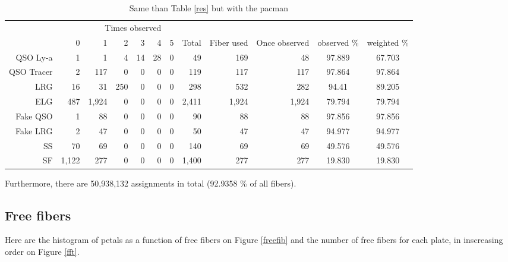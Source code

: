 \documentclass{extarticle}
\begin{document}
\begin{table}[H]\begin{center}
\begin{tabular}{rrrrrrrrrrcc}
\hline
\multicolumn{6}{r}{Times observed} \\
	~ &           0 &     1 &  2 & 3 & 4 & 5 &  Total & Fiber used & Once observed & observed $\%$ & weighted $\%$ \\ \hline
   QSO Ly-a   &     1 &     1 &   4 & 14 & 28 & 0 &    49 &   169 &    48 & 97.889 & 67.703\\ 
 QSO Tracer   &     2 &   117 &   0 &  0 &  0 & 0 &   119 &   117 &   117 & 97.864 & 97.864\\ 
        LRG   &    16 &    31 & 250 &  0 &  0 & 0 &   298 &   532 &   282 &  94.41 & 89.205\\ 
        ELG   &   487 & 1,924 &   0 &  0 &  0 & 0 & 2,411 & 1,924 & 1,924 & 79.794 & 79.794\\ 
   Fake QSO   &     1 &    88 &   0 &  0 &  0 & 0 &    90 &    88 &    88 & 97.856 & 97.856\\ 
   Fake LRG   &     2 &    47 &   0 &  0 &  0 & 0 &    50 &    47 &    47 & 94.977 & 94.977\\ 
         SS   &    70 &    69 &   0 &  0 &  0 & 0 &   140 &    69 &    69 & 49.576 & 49.576\\ 
         SF   & 1,122 &   277 &   0 &  0 &  0 & 0 & 1,400 &   277 &   277 & 19.830 & 19.830\\ 
\hline
\end{tabular}
\caption{Same than Table \ref{res} but with the pacman}\label{pac}
\end{center}\end{table}

Furthermore, there are 50,938,132 assignments in total (92.9358 \% of all fibers).

\subsection{Free fibers}
Here are the histogram of petals as a function of free fibers on Figure \ref{freefib} and the number of free fibers for each plate, in inscreasing order on Figure \ref{fft}.
\end{document}

